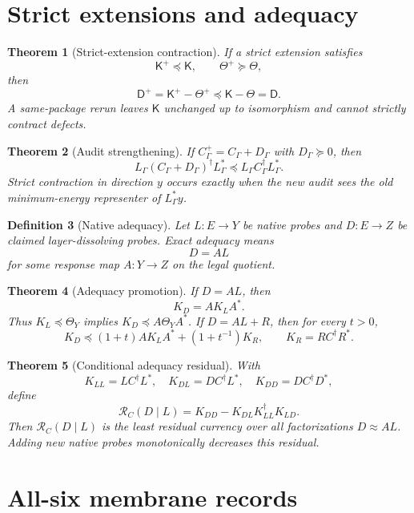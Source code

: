 \documentclass[11pt]{article}
\newtheorem{theorem}{Theorem}[section]
\newtheorem{definition}[theorem]{Definition}
\newcommand{\K}{\mathsf K}
\newcommand{\Defect}{\mathsf D}
\begin{document}
\section{Strict extensions and adequacy}

\begin{theorem}[Strict-extension contraction]
If a strict extension satisfies
\[
  \K^+\preceq\K,
  \qquad \Theta^+\succeq\Theta,
\]
then
\[
  \Defect^+=\K^+-\Theta^+\preceq \K-\Theta=\Defect.
\]
A same-package rerun leaves \(\K\) unchanged up to isomorphism and cannot strictly contract defects.
\end{theorem}

\begin{theorem}[Audit strengthening]
If \(C_\Gamma^+=C_\Gamma+D_\Gamma\) with \(D_\Gamma\succeq0\), then
\[
  L_\Gamma(C_\Gamma+D_\Gamma)^\dagger L_\Gamma^*
  \preceq
  L_\Gamma C_\Gamma^\dagger L_\Gamma^*.
\]
Strict contraction in direction \(y\) occurs exactly when the new audit sees the old minimum-energy representer of \(L_\Gamma^*y\).
\end{theorem}

\begin{definition}[Native adequacy]
Let \(L:E\to Y\) be native probes and \(D:E\to Z\) be claimed layer-dissolving probes.  Exact adequacy means
\[
  D=A L
\]
for some response map \(A:Y\to Z\) on the legal quotient.
\end{definition}

\begin{theorem}[Adequacy promotion]
If \(D=A L\), then
\[
  K_D=A K_L A^*.
\]
Thus \(K_L\preceq\Theta_Y\) implies \(K_D\preceq A\Theta_YA^*\).  If \(D=AL+R\), then for every \(t>0\),
\[
  K_D\preceq (1+t)A K_LA^*+(1+t^{-1})K_R,
  \qquad K_R=RC^\dagger R^*.
\]
\end{theorem}

\begin{theorem}[Conditional adequacy residual]
With
\[
  K_{LL}=LC^\dagger L^*,\quad K_{DL}=DC^\dagger L^*,\quad K_{DD}=DC^\dagger D^*,
\]
define
\[
  \mathcal R_C(D\mid L)=K_{DD}-K_{DL}K_{LL}^\dagger K_{LD}.
\]
Then \(\mathcal R_C(D\mid L)\) is the least residual currency over all factorizations \(D\approx AL\).  Adding new native probes monotonically decreases this residual.
\end{theorem}

\section{All-six membrane records}
\end{document}
